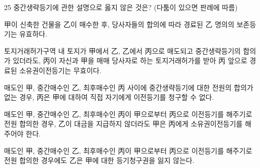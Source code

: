 \begin{question}{25}
중간생략등기에 관한 설명으로 옳지 않은 것은? (다툼이 있으면 판례에 따름)
\begin{choices}
  \item 甲이 신축한 건물을 乙이 매수한 후, 당사자들의 합의에 따라 경료된 乙 명의의 보존등기는 유효하다.
  \item 토지거래허가구역 내 토지가 甲에서 乙, 乙에서 丙으로 매도되고 중간생략등기의 합의가 있더라도, 丙이 자신과 甲을 매매 당사자로 하는 토지거래허가를 받아 丙 앞으로 경료된 소유권이전등기는 무효이다.
  \item 매도인 甲, 중간매수인 乙, 최후매수인 丙 사이에 중간생략등기에 대한 전원의 합의가 없는 경우, 丙은 甲에 대하여 직접 자기에게 이전등기를 청구할 수 없다.
  \item 매도인 甲, 중간매수인 乙, 최후매수인 丙이 甲으로부터 丙으로 이전등기를 해주기로 전원 합의한 경우, 乙이 대금을 지급하지 않더라도 甲은 丙에게 소유권이전등기를 해주어야 한다.
  \item 매도인 甲, 중간매수인 乙, 최후매수인 丙이 甲으로부터 丙으로 이전등기를 해주기로 전원 합의한 경우에도 乙은 甲에 대한 등기청구권을 잃지 않는다.
\end{choices}
\end{question}
